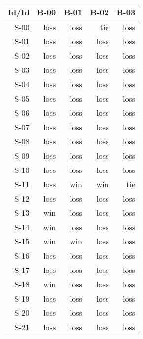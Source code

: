 \begin{tabular}{ | r | r | r | r | r | }
    \hline
        Id/Id  &   B-00  &   B-01  &   B-02  &   B-03  \\
    \hline
    \hline
         S-00  &   loss  &   loss  &    tie  &   loss  \\
    \hline
         S-01  &   loss  &   loss  &   loss  &   loss  \\
    \hline
         S-02  &   loss  &   loss  &   loss  &   loss  \\
    \hline
         S-03  &   loss  &   loss  &   loss  &   loss  \\
    \hline
         S-04  &   loss  &   loss  &   loss  &   loss  \\
    \hline
         S-05  &   loss  &   loss  &   loss  &   loss  \\
    \hline
         S-06  &   loss  &   loss  &   loss  &   loss  \\
    \hline
         S-07  &   loss  &   loss  &   loss  &   loss  \\
    \hline
         S-08  &   loss  &   loss  &   loss  &   loss  \\
    \hline
         S-09  &   loss  &   loss  &   loss  &   loss  \\
    \hline
         S-10  &   loss  &   loss  &   loss  &   loss  \\
    \hline
         S-11  &   loss  &    win  &    win  &    tie  \\
    \hline
         S-12  &   loss  &   loss  &   loss  &   loss  \\
    \hline
         S-13  &    win  &   loss  &   loss  &   loss  \\
    \hline
         S-14  &    win  &   loss  &   loss  &   loss  \\
    \hline
         S-15  &    win  &    win  &   loss  &   loss  \\
    \hline
         S-16  &   loss  &   loss  &   loss  &   loss  \\
    \hline
         S-17  &   loss  &   loss  &   loss  &   loss  \\
    \hline
         S-18  &    win  &   loss  &   loss  &   loss  \\
    \hline
         S-19  &   loss  &   loss  &   loss  &   loss  \\
    \hline
         S-20  &   loss  &   loss  &   loss  &   loss  \\
    \hline
         S-21  &   loss  &   loss  &   loss  &   loss  \\

\end{tabular}
